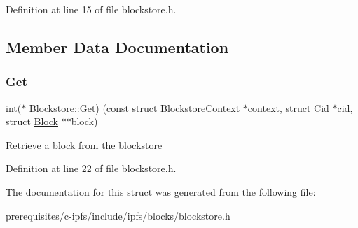 Definition at line 15 of file blockstore.\+h.



\subsection{Member Data Documentation}
\mbox{\label{struct_blockstore_ac1e6e1a9463c75febb3bdf09e81c6497}} 
\subsubsection{\texorpdfstring{Get}{Get}}
{\footnotesize\ttfamily int($\ast$ Blockstore\+::\+Get) (const struct \mbox{\hyperlink{struct_blockstore_context}{Blockstore\+Context}} $\ast$context, struct \mbox{\hyperlink{struct_cid}{Cid}} $\ast$cid, struct \mbox{\hyperlink{struct_block}{Block}} $\ast$$\ast$block)}

Retrieve a block from the blockstore 

Definition at line 22 of file blockstore.\+h.



The documentation for this struct was generated from the following file\+:\begin{DoxyCompactItemize}
\item 
prerequisites/c-\/ipfs/include/ipfs/blocks/blockstore.\+h\end{DoxyCompactItemize}
